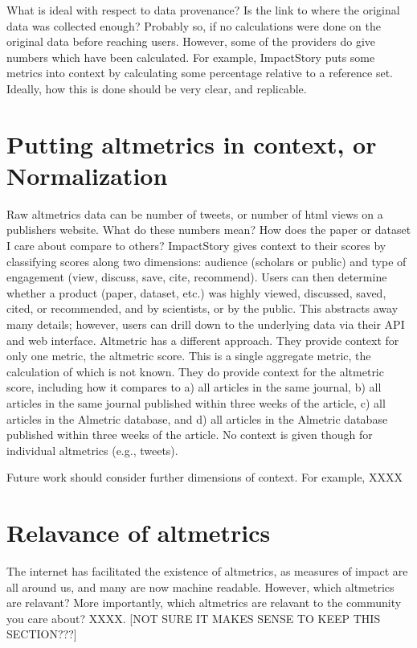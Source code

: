 \documentclass[letterpaper,superscriptaddress,showkeys,longbibliography]{revtex4-1}\usepackage{graphicx, color}
\begin{document}
What is ideal with respect to data provenance? Is the link to where the original data was collected enough? Probably so, if no calculations were done on the original data before reaching users. However, some of the providers do give numbers which have been calculated. For example, ImpactStory puts some metrics into context by calculating some percentage relative to a reference set. Ideally, how this is done should be very clear, and replicable. 


\section*{Putting altmetrics in context, or Normalization}

Raw altmetrics data can be number of tweets, or number of html views on a publishers website. What do these numbers mean? How does the paper or dataset I care about compare to others? ImpactStory gives context to their scores by classifying scores along two dimensions: audience (scholars or public) and type of engagement (view, discuss, save, cite, recommend). Users can then determine whether a product (paper, dataset, etc.) was highly viewed, discussed, saved, cited, or recommended, and by scientists, or by the public. This abstracts away many details; however, users can drill down to the underlying data via their API and web interface.  Altmetric has a different approach. They provide context for only one metric, the altmetric score. This is a single aggregate metric, the calculation of which is not known. They do provide context for the altmetric score, including how it compares to a) all articles in the same journal, b) all articles in the same journal published within three weeks of the article, c) all articles in the Almetric database, and d) all articles in the Almetric database published within three weeks of the article. No context is given though for individual altmetrics (e.g., tweets). 

Future work should consider further dimensions of context. For example, XXXX

\section*{Relavance of altmetrics}

The internet has facilitated the existence of altmetrics, as measures of impact are all around us, and many are now machine readable. However, which altmetrics are relavant? More importantly, which altmetrics are relavant to the community you care about? XXXX. [NOT SURE IT MAKES SENSE TO KEEP THIS SECTION???]
\end{document}
